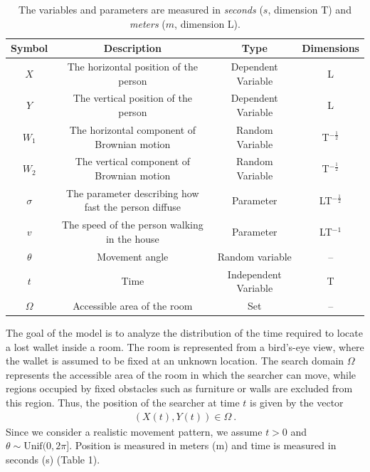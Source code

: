 \documentclass{article}
\begin{document}
\vspace{5mm}

\begin{table}[!h]
\begin{center}
\begin{tabular}{||c | c | c | c||} 
 \hline
 Symbol & Description & Type & Dimensions \\ [0.3ex] 
 \hline\hline
 $X$ & The horizontal position of the person & Dependent Variable & L \\ 
 \hline
 $Y$ &  The vertical position of the person & Dependent Variable & L \\ 
 \hline
 $W_1$ & The horizontal component of Brownian motion  & Random Variable & T$^{-\frac{1}{2}}$ \\ 
 \hline
 $W_2$ & The vertical component of Brownian motion  & Random Variable & T$^{-\frac{1}{2}}$ \\ 
 \hline
 $\sigma$ & The parameter describing how fast the person diffuse& Parameter & LT$^{-\frac{1}{2}}$ \\ 
 \hline
 $v$ & The speed of the person walking in the house & Parameter & LT$^{-1}$ \\ 
 \hline
 $\theta$ & Movement angle & Random variable & -- \\ 
 \hline
 $t$ & Time & Independent Variable & T \\ 
 \hline
 $\Omega$ & Accessible area of the room & Set & -- \\ 
 \hline
\end{tabular} 
\end{center}
\captionsetup{font=small}
\caption{The variables and parameters are measured in \textit{seconds} ($s$, dimension T) and \textit{meters} ($m$, dimension L).} %
\end{table}

\noindent The goal of the model is to analyze the distribution of the time required to locate a lost wallet inside a room. The room is represented from a bird’s-eye view, where the wallet is assumed to be fixed at an unknown location. The search domain $\Omega$ represents the accessible area of the room in which the searcher can move, while regions occupied by fixed obstacles such as furniture or walls are excluded from this region. Thus, the position of the searcher at time $t$ is given by the vector 
\begin{align*}
    (X(t), Y(t)) \in \Omega \ .
\end{align*}
Since we consider a realistic movement pattern, we assume $t > 0$ and $\theta \sim \text{Unif}(0, 2\pi]$. Position is measured in meters (m) and time is measured in seconds (s) (Table 1).
\end{document}
